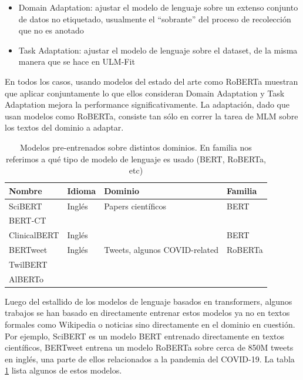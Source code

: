 \begin{itemize}
    \item Domain Adaptation: ajustar el modelo de lenguaje sobre un extenso conjunto de datos no etiquetado, usualmente el ``sobrante'' del proceso de recolección que no es anotado
    \item Task Adaptation: ajustar el modelo de lenguaje sobre el dataset, de la misma manera que se hace en ULM-Fit
\end{itemize}

En todos los casos, usando modelos del estado del arte como RoBERTa muestran que aplicar conjuntamente lo que ellos consideran Domain Adaptation y Task Adaptation mejora la performance significativamente. La adaptación, dado que usan modelos como RoBERTa, consiste tan sólo en correr la tarea de MLM sobre los textos del dominio a adaptar.

\begin{table}
    \centering
    \begin{tabular}{llll}
        Nombre                                 & Idioma            & Dominio                          & Familia     \\
        \hline
        SciBERT\cite{beltagy-etal-2019-scibert} & Inglés            & Papers científicos               & BERT        \\
        BERT-CT                                 &                   &                                  &             \\
        ClinicalBERT\cite{huang2019clinicalbert}& Inglés            &                                  & BERT        \\
        BERTweet\cite{bertweet}                 & Inglés            & Tweets, algunos COVID-related    & RoBERTa     \\
        TwilBERT                                &                   &                                  &             \\
        AlBERTo                                 &                   &                                  &             \\
    \end{tabular}

    \caption{Modelos pre-entrenados sobre distintos dominios. En familia nos referimos a qué tipo de modelo de lenguaje es usado (BERT, RoBERTa, etc)}
    \label{tab:bert_pretrained_models}
\end{table}


Luego del estallido de los modelos de lenguaje basados en transformers, algunos trabajos se han basado en directamente entrenar estos modelos ya no en textos formales como Wikipedia o noticias sino directamente en el dominio en cuestión. Por ejemplo, SciBERT \cite{beltagy-etal-2019-scibert} es un modelo BERT entrenado directamente en textos científicos, BERTweet \cite{bertweet} entrena un modelo RoBERTa\cite{liu2019roberta} sobre cerca de 850M tweets en inglés, una parte de ellos relacionados a la pandemia del COVID-19. La tabla \ref{tab:bert_pretrained_models} lista algunos de estos modelos.

